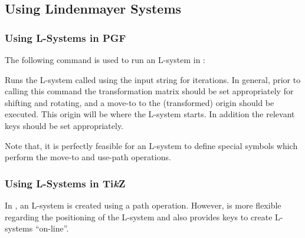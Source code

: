 \subsection{Using Lindenmayer Systems}
\subsubsection{Using L-Systems in PGF}

The following command is used to run an L-system in \pgfname:
\begin{command}{\pgflindenmayersystem{}}
  Runs the L-system called  using the input string 
  for  iterations.
  In general, prior to calling this command the
  transformation matrix should be set appropriately for shifting and
  rotating, and a move-to to the (transformed) origin should be
  executed. This origin will be where the L-system starts.
  In addition the relevant keys should be set appropriately.

\begin{codeexample}[]
\end{codeexample}

  Note that, it is perfectly feasible for an L-system to define
  special symbols which perform the move-to and use-path
  operations.

\end{command}

\subsubsection{Using L-Systems in Ti\emph{k}Z}

  In \tikzname, an L-system is created using a path operation.
  However, \tikzname{} is more flexible regarding the positioning
  of the L-system and also provides keys to create L-systems
  ``on-line''.

